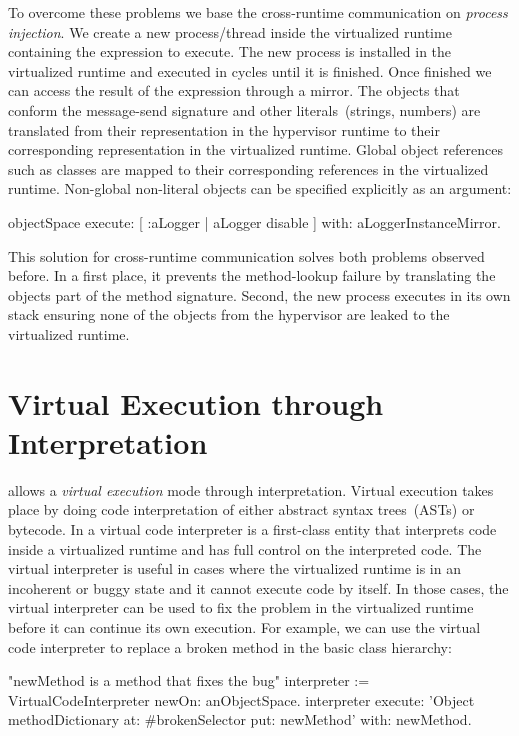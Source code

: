 To overcome these problems we base the cross-runtime communication on \emph{process injection}. We create a new process/thread inside the virtualized runtime containing the expression to execute. The new process is installed in the virtualized runtime and executed in cycles until it is finished. Once finished we can access the result of the expression through a mirror. The objects that conform the message-send signature and other literals~(\eg strings, numbers) are translated from their representation in the hypervisor runtime to their corresponding representation in the virtualized runtime. Global object references such as classes are mapped to their corresponding references in the virtualized runtime. Non-global non-literal objects can be specified explicitly as an argument:

\begin{code}
objectSpace
	execute: [ :aLogger | aLogger disable ]
	with: aLoggerInstanceMirror.
\end{code}

This solution for cross-runtime communication solves both problems observed before. In a first place, it prevents the method-lookup failure by translating the objects part of the method signature. Second, the new process executes in its own stack ensuring none of the objects from the hypervisor are leaked to the virtualized runtime.

\section{Virtual Execution through Interpretation} \label{sec:interpretation}

\Vtt allows a \emph{virtual execution} mode through interpretation. Virtual execution takes place by doing code interpretation of either abstract syntax trees~(ASTs) or bytecode. In \Vtt a virtual code interpreter is a first-class entity that interprets code inside a virtualized runtime and has full control on the interpreted code. The virtual interpreter is useful in cases where the virtualized runtime is in an incoherent or buggy state and it cannot execute code by itself. In those cases, the virtual interpreter can be used to fix the problem in the virtualized runtime before it can continue its own execution. For example, we can use the virtual code interpreter to replace a broken method in the basic class hierarchy:

\begin{code}
"newMethod is a method that fixes the bug"
interpreter := VirtualCodeInterpreter newOn: anObjectSpace.
interpreter
	execute: 'Object methodDictionary at: #brokenSelector put: newMethod'
	with: newMethod.
\end{code}

